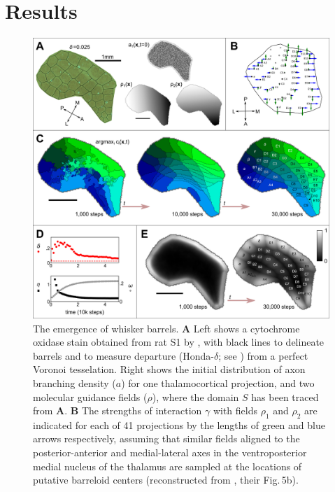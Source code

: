 \documentclass[9pt,lineno]{elife}
\newcommand{\cmnt}[1]{\textcolor{colcmnt}{#1}}
\begin{document}
\section{Results}

\begin{figure}
  \begin{fullwidth}
    \includegraphics[width=\linewidth]{./Fig1.png}
    \caption{The emergence of whisker barrels.
      \textbf{A} Left shows a cytochrome oxidase stain obtained from rat S1
      by \cite{zheng_signal_2001}, with black lines to delineate barrels and to
      measure departure (Honda-$\delta$; see \citealp{senft_mouse_1991}) from a
      perfect Voronoi tesselation. Right shows the initial distribution of axon
      branching density ($a$) for one thalamocortical projection, and two
      molecular guidance fields ($\rho$), \cmnt{where the domain $S$ has been
        traced from \textbf{A}}.
      \textbf{B} The strengths of interaction $\gamma$ with fields $\rho_1$
      and $\rho_2$ are indicated for each of 41 projections by the lengths of
      green and blue arrows respectively, assuming that similar fields aligned
      to the posterior-anterior and medial-lateral axes in the ventroposterior
      medial nucleus of the thalamus are sampled at the locations of putative
      barreloid centers (reconstructed from \citealp{haidarliu_size_2001},
      their \cmnt{Fig.\,5b}).
}
\end{fullwidth}
\end{figure}
\end{document}
